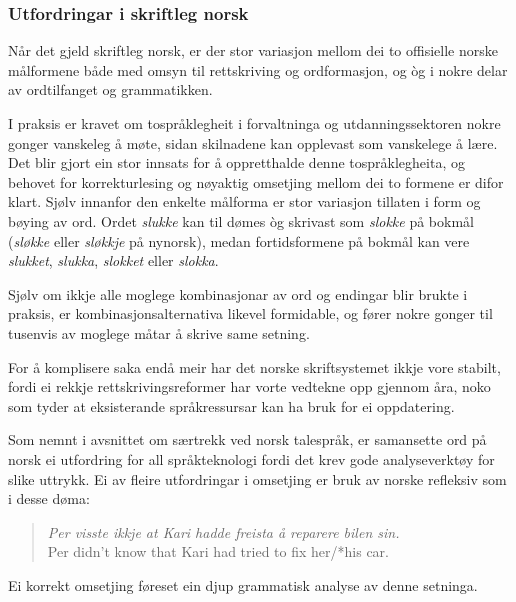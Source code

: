 \begin{multicols}{2}
\subsubsection{Utfordringar i skriftleg norsk}

Når det gjeld skriftleg norsk, er der stor variasjon mellom dei to offisielle norske målformene både med omsyn til rettskriving og ordformasjon, og òg i nokre delar av ordtilfanget og grammatikken. 

I praksis er kravet om tospråklegheit i forvaltninga og utdanningssektoren nokre gonger vanskeleg å møte, sidan skilnadene kan opplevast som vanskelege å lære. Det blir gjort ein stor innsats for å oppretthalde denne tospråklegheita, og behovet for korrekturlesing og nøyaktig omsetjing mellom dei to formene er difor klart. Sjølv innanfor den enkelte målforma er stor variasjon tillaten i form og bøying av ord. Ordet \textit{slukke} kan til dømes òg skrivast som \textit{slokke} på bokmål (\textit{sløkke} eller \textit{sløkkje} på nynorsk), medan fortidsformene på bokmål kan vere \textit{slukket}, \textit{slukka}, \textit{slokket} eller \textit{slokka}. 


Sjølv om ikkje alle moglege kombinasjonar av ord og endingar blir brukte i praksis, er kombinasjonsalternativa likevel formidable, og fører nokre gonger til tusenvis av moglege måtar å skrive same setning. 

For å komplisere saka endå meir har det norske skriftsystemet ikkje vore stabilt, fordi ei rekkje rettskrivingsreformer har vorte vedtekne opp gjennom åra, noko som tyder at eksisterande språkressursar kan ha bruk for ei oppdatering. 

Som nemnt i avsnittet om særtrekk ved norsk talespråk, er samansette ord på norsk ei utfordring for all språkteknologi fordi det krev gode analyseverktøy for slike uttrykk.
Ei av fleire utfordringar i omsetjing er bruk av norske refleksiv som i desse døma:

\begin{quote} 
	\emph{Per visste ikkje at Kari hadde freista å reparere bilen \emph{sin}.}\\
	Per didn’t know that Kari had tried to fix her/*his car.
\end{quote}

Ei korrekt omsetjing føreset ein djup grammatisk analyse av denne setninga. 


\end{multicols}
